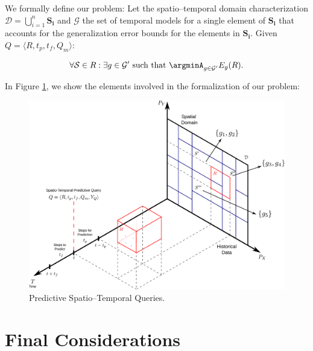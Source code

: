 We formally define our problem: Let the spatio--temporal domain characterization $\mathcal{D} = \bigcup_{i=1}^{n} \mathbf{S_i}$ and $\mathcal{G}$ the set of temporal models for a single element of $\mathbf{S_i}$ that accounts for the generalization error bounds for the elements in $\mathbf{S_i}$. Given $Q = \langle R, t_p, t_f, Q_{m} \rangle$:

\begin{equation}
\forall \mathcal{S} \in R: \exists g \in \mathcal{G'} \,\,\textrm{such that} \,\, \argminA_{g\in\mathcal{G'}} E_{g}(R).
\end{equation}

\noindent In Figure \ref{fig:time-series}, we show the elements involved in the formalization of our problem:
\begin{figure}[htb]
	\centering
	\includegraphics[scale=0.15]{../Figures/RepresentationTimeSeries}
	\caption{Predictive Spatio--Temporal Queries.}
	\label{fig:time-series}
\end{figure}

\section{Final Considerations}